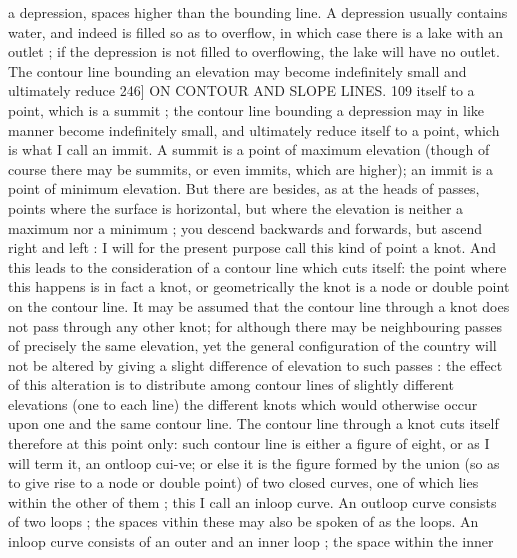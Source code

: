 \documentclass[11pt,a4paper]{book}
\begin{document}
a  depression,  spaces  higher  than  the  bounding  line.  A  depression  usually  contains
water,  and  indeed  is  filled  so  as  to  overflow,  in  which  case  there  is  a  lake  with  an
outlet ;  if  the  depression  is  not  filled  to  overflowing,  the  lake  will  have  no  outlet.  The
contour   line  bounding  an  elevation  may  become  indefinitely  small  and  ultimately  reduce
246]  ON   CONTOUR   AND   SLOPE   LINES.  109
itself  to  a  point,  which  is  a  summit ;  the  contour  line  bounding  a  depression  may  in
like  manner  become  indefinitely  small,  and  ultimately  reduce  itself  to  a  point,  which
is  what  I  call  an  immit.  A  summit  is  a  point  of  maximum  elevation  (though  of
course  there  may  be  summits,  or  even  immits,  which  are  higher);  an  immit  is  a  point
of  minimum  elevation.  But  there  are  besides,  as  at  the  heads  of  passes,  points  where
the  surface  is  horizontal,  but  where  the  elevation  is  neither  a  maximum  nor  a
minimum ;  you  descend  backwards  and  forwards,  but  ascend  right  and  left :  I  will  for
the  present  purpose  call  this  kind  of  point  a  knot.  And  this  leads  to  the  consideration
of  a  contour  line  which  cuts  itself:  the  point  where  this  happens  is  in  fact  a  knot,
or  geometrically  the  knot  is  a  node  or  double  point  on  the  contour  line.  It  may  be
assumed  that  the  contour  line  through  a  knot  does  not  pass  through  any  other  knot;
for  although  there  may  be  neighbouring  passes  of  precisely  the  same  elevation,  yet  the
general  configuration  of  the  country  will  not  be  altered  by  giving  a  slight  difference
of  elevation  to  such  passes :  the  effect  of  this  alteration  is  to  distribute  among  contour
lines  of  slightly  different  elevations  (one  to  each  line)  the  different  knots  which  would
otherwise  occur  upon  one  and  the  same  contour  line.  The  contour  line  through  a
knot  cuts  itself  therefore  at  this  point  only:  such  contour  line  is  either  a  figure  of
eight,  or  as  I  will  term  it,  an  ontloop  cui-ve;  or  else  it  is  the  figure  formed  by  the
union  (so  as  to  give  rise  to  a  node  or  double  point)  of  two  closed  curves,  one  of
which  lies  within  the  other  of  them ;  this  I  call  an  inloop  curve.  An  outloop  curve
consists  of  two  loops ;  the  spaces  vithin  these  may  also  be  spoken  of  as  the  loops.
An  inloop  curve  consists  of  an  outer  and  an  inner  loop ;  the  space  within  the  inner
\end{document}
